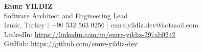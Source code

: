 \begin{center}
    \textbf{\Huge \scshape Emre YILDIZ} \\ \vspace{2pt}
    \large Software Architect and Engineering Lead \\ \vspace{2pt}
    Izmir, Turkey $|$ +90 532 563 0256 $|$ emre.yildiz.dev@hotmail.com \\ \vspace{1pt}
    LinkedIn: \href{https://linkedin.com/in/emre-yildiz-297ab0242}{\underline{https://linkedin.com/in/emre-yildiz-297ab0242}} \\ \vspace{1pt}
    GitHub: \href{https://github.com/emre-yildiz-dev}{\underline{https://github.com/emre-yildiz-dev}}
\end{center}